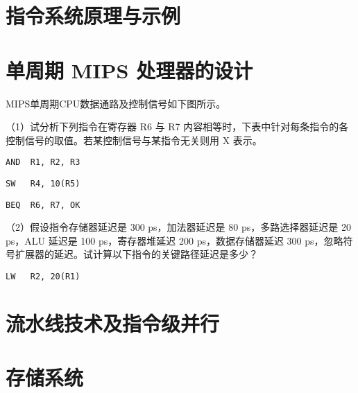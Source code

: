 \documentclass[cn, hazy, blue, normal, 12pt]{elegantnote}
\begin{document}
\begin{solution}[print=true]



\end{solution}


\section{指令系统原理与示例}



\section{单周期 MIPS 处理器的设计}

\begin{exercise}

    MIPS单周期CPU数据通路及控制信号如下图所示。

    （1）试分析下列指令在寄存器 R6 与 R7 内容相等时，下表中针对每条指令的各控制信号的取值。若某控制信号与某指令无关则用 X 表示。

    \lstinline{AND  R1, R2, R3}\par
    \lstinline{SW   R4, 10(R5)}\par
    \lstinline{BEQ  R6, R7, OK}

    （2）假设指令存储器延迟是 300 ps，加法器延迟是 80 ps，多路选择器延迟是 20 ps，ALU 延迟是 100 ps，寄存器堆延迟 200 ps，数据存储器延迟 300 ps，忽略符号扩展器的延迟。试计算以下指令的关键路径延迟是多少？

    \lstinline{LW   R2, 20(R1)}

\end{exercise}




\begin{solution}[print=true]



\end{solution}



\section{流水线技术及指令级并行}



\section{存储系统}
\end{document}
